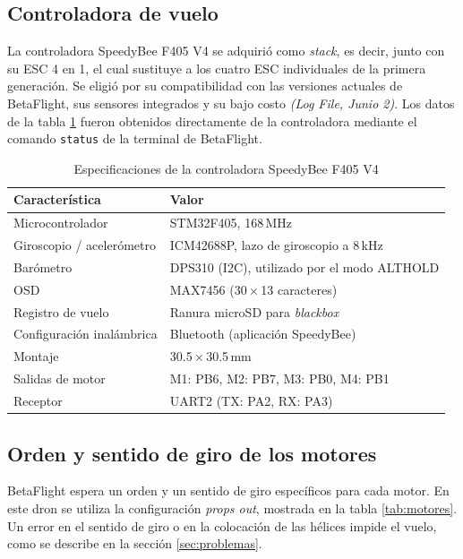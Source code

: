 \documentclass[11pt,letterpaper]{article}
\newcommand{\logref}[1]{\textit{(Log File, #1)}}
\begin{document}
\subsection{Controladora de vuelo}
La controladora SpeedyBee F405 V4 se adquirió como \textit{stack}, es decir, junto con su ESC 4 en 1, el cual sustituye a los cuatro ESC individuales de la primera generación. Se eligió por su compatibilidad con las versiones actuales de BetaFlight, sus sensores integrados y su bajo costo \logref{Junio 2}. Los datos de la tabla \ref{tab:fc} fueron obtenidos directamente de la controladora mediante el comando \texttt{status} de la terminal de BetaFlight.

\begin{table}[!ht]
\centering
\caption{Especificaciones de la controladora SpeedyBee F405 V4}
\label{tab:fc}
\begin{tabularx}{\textwidth}{@{}lX@{}}
\toprule
\textbf{Característica} & \textbf{Valor} \\
\midrule
Microcontrolador & STM32F405, 168\,MHz \\
Giroscopio / acelerómetro & ICM42688P, lazo de giroscopio a 8\,kHz \\
Barómetro & DPS310 (I2C), utilizado por el modo ALTHOLD \\
OSD & MAX7456 (30\,$\times$\,13 caracteres) \\
Registro de vuelo & Ranura microSD para \textit{blackbox} \\
Configuración inalámbrica & Bluetooth (aplicación SpeedyBee) \\
Montaje & 30.5\,$\times$\,30.5\,mm \\
Salidas de motor & M1: PB6, M2: PB7, M3: PB0, M4: PB1 \\
Receptor & UART2 (TX: PA2, RX: PA3) \\
\bottomrule
\end{tabularx}
\end{table}

\subsection{Orden y sentido de giro de los motores}
BetaFlight espera un orden y un sentido de giro específicos para cada motor. En este dron se utiliza la configuración \textit{props out}, mostrada en la tabla \ref{tab:motores}. Un error en el sentido de giro o en la colocación de las hélices impide el vuelo, como se describe en la sección \ref{sec:problemas}.
\end{document}
